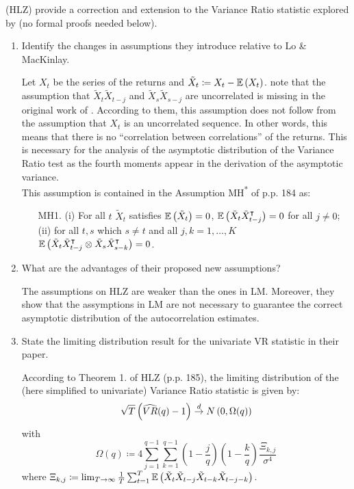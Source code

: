 \documentclass[12pt,twoside]{article}
\begin{document}
\citet{hong2017investigation} (HLZ) provide a correction and extension to the
Variance Ratio statistic explored by \citet{lo1988stock} (no formal proofs needed below).
\begin{enumerate}[label = \alph*)]
    \item Identify the changes in assumptions they introduce relative to Lo \& MacKinlay.
    \begin{solution}
        Let \(X_t\) be the series of the returns and \(\tilde X_t \coloneqq X_t - \mathbb{E}\left(X_t\right)\). \citet{hong2017investigation} note that the assumption that \(\tilde X_{t}\tilde X_{t-j}\) and \(\tilde X_{s}\tilde X_{s-j}\) are uncorrelated is missing in the original work of \citet{lo1988stock}. According to them, this assumption does not follow from the assumption that \(X_t\) is an uncorrelated sequence. In other words, this means that there is no ``correlation between correlations'' of the returns. This is necessary for the analysis of the asymptotic distribution of the Variance Ratio test as the fourth moments appear in the derivation of the asymptotic variance. \\
        This assumption is contained in the Assumption MH\textsuperscript{*} of \citet{hong2017investigation} p.p. 184 as:
        \begin{itemize}
            \item[MH1.] (i) For all \(t\) \(\tilde X_t\) satisfies \(\mathbb{E}\left(\tilde X_t\right) = 0\), \(\mathbb{E}\left(\tilde X_t \tilde X_{t-j}^\intercal\right) = 0\) for all \(j \neq 0\); (ii) for all \(t,s\) which \(s\neq t\) and all \(j,k = 1, \dots, K\) \(\mathbb{E}\left(\tilde X_t \tilde X_{t-j}^\intercal \otimes \tilde X_s \tilde X_{s-k}^\intercal\right) = 0\).
        \end{itemize}
    \end{solution}
    \item What are the advantages of their proposed new assumptions?
    \begin{solution}
        The assumptions on HLZ are weaker than the ones in LM. Moreover, they show that the assymptions in LM are not necessary to guarantee the correct asymptotic distribution of the autocorrelation estimates. 
    \end{solution}
    \item State the limiting distribution result for the univariate VR statistic in their paper.
    \begin{solution}
        According to Theorem 1. of HLZ (p.p. 185), the limiting distribution of the (here simplified to univariate) Variance Ratio statistic is given by:
        \[
            \sqrt{T}\left(\widehat{VR}(q)-1\right) \overset{d}{\rightarrow} N\left(0, \Omega(q)\right)
        \]
        with
        \[
            \Omega(q) \coloneqq 4\sum_{j=1}^{q-1}\sum_{k=1}^{q-1}\left(1-\frac{j}{q}\right)\left(1-\frac{k}{q}\right) \frac{\Xi_{k,j}}{\sigma^4}
        \]
        where \(\Xi_{k,j}\coloneqq \lim_{T\to\infty}\frac{1}{T}\sum_{t=1}^{T}\mathbb{E}\left(\tilde X_{t}\tilde X_{t-j}\tilde X_{t-k}\tilde X_{t-j-k}\right)\).
    \end{solution}
\end{enumerate}
\end{document}
